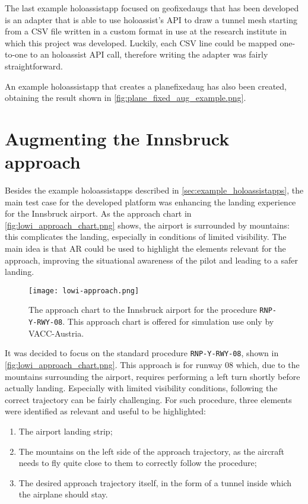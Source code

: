 The last example \gls{holoassistapp} focused on \glspl{geofixedaug} that has been developed is an adapter that is able to use \gls{holoassist}'s \gls{API} to draw a tunnel mesh starting from a CSV file written in a custom format in use at the research institute in which this project was developed. Luckily, each CSV line could be mapped one-to-one to an \gls{holoassist} \gls{API} call, therefore writing the adapter was fairly straightforward.

An example \gls{holoassistapp} that creates a \gls{planefixedaug} has also been created, obtaining the result shown in \autoref{fig:plane_fixed_aug_example.png}. 

\section{Augmenting the Innsbruck approach}

Besides the example \glspl{holoassistapp} described in \autoref{sec:example_holoassistapps}, the main test case for the developed platform was enhancing the landing experience for the Innsbruck airport. As the approach chart in \autoref{fig:lowi_approach_chart.png} shows, the airport is surrounded by mountains: this complicates the landing, especially in conditions of limited visibility. The main idea is that \gls{AR} could be used to highlight the elements relevant for the approach, improving the situational awareness of the pilot and leading to a safer landing.

\begin{figure}[p]
  \centering
  \texttt{[image: lowi-approach.png]}
  \caption{The approach chart to the Innsbruck airport for the procedure \texttt{RNP-Y-RWY-08}. This approach chart is offered for simulation use only by VACC-Austria\cite{vacc_austria_lowi_nodate}.}\label{fig:lowi_approach_chart.png}
\end{figure}

It was decided to focus on the standard procedure \texttt{RNP-Y-RWY-08}, shown in \autoref{fig:lowi_approach_chart.png}. This approach is for runway 08 which, due to the mountains surrounding the airport, requires performing a left turn shortly before actually landing. Especially with limited visibility conditions, following the correct trajectory can be fairly challenging. For such procedure, three elements were identified as relevant and useful to be highlighted:

\begin{enumerate}
    \item The airport landing strip;
    \item The mountains on the left side of the approach trajectory, as the aircraft needs to fly quite close to them to correctly follow the procedure;
    \item The desired approach trajectory itself, in the form of a tunnel inside which the airplane should stay.
\end{enumerate}

